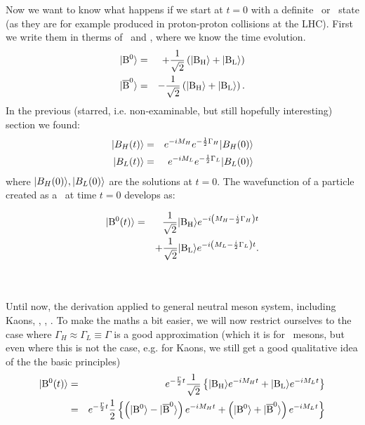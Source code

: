 Now we want to know what happens if we start at $t=0$ with a definite \Bo\ or \Bob\ state (as they are for example produced in proton-proton collisions at the LHC).
First we write them in therms of \Bh\ and \Bl, where we know the time evolution.
\begin{eqnarray}
 | {\rm B^0} \rangle &=&  + \frac{1}{\sqrt{2}} \left( | {\rm B_{H}} \rangle +  | {\rm B_{L}} \rangle\right)\nonumber\\
 | {\rm \overline{B}^0} \rangle&=&  - \frac{1}{\sqrt{2}} \left( | {\rm B_{H}} \rangle +   | {\rm B_{L}} \rangle\right)
.
\end{eqnarray}
%
In the previous (starred, i.e. non-examinable, but still hopefully interesting) section we found:
 \begin{eqnarray}
  | B_H(t) \rangle &=& e^{-iM_H} e^{-\frac{1}{2}\Gamma_H}  | B_H(0) \rangle \nonumber\\
  | B_L(t) \rangle &=& e^{-iM_L} e^{-\frac{1}{2}\Gamma_L}  | B_L(0) \rangle 
 \end{eqnarray}
 where $ | B_H(0) \rangle,  | B_L(0) \rangle$ are the solutions at $t=0$.
%
 The wavefunction of a particle created as a \Bo\ at time $t=0$
 develops as:\\
\newcommand{\expheavy}{e^{-i\left(M_H -\frac{i}{2}\Gamma_H \right) t}}
\newcommand{\explight}{e^{-i\left(M_L -\frac{i}{2}\Gamma_L \right) t}}
\newcommand{\expmh}{e^{-i M_H t}}
\newcommand{\expml}{e^{-i M_L t}}
\newcommand{\expthalf}{e^{-\frac{\Gamma}{2}t}}
%
\parbox{0.97\columnwidth}{
\begin{eqnarray}
%
\ket{\Bo(t)}&=&   \frac{1}{\sqrt{2}}\ket{\Bh}\expheavy \nonumber\\
            & & + \frac{1}{\sqrt{2}}\ket{\Bl}\explight 
.
\nonumber\\
\mbox{}
%
\end{eqnarray}}\\
 Until now, the derivation applied to general neutral meson system,
 including Kaons, \prt{\Do}, , \prt{\Bo}. To make the maths a bit easier, we will now restrict ourselves to the case where $\Gamma_H \approx \Gamma_L \equiv \Gamma$ is a
 good approximation (which it is for \Bo\ mesons, but even where this is not the case, e.g. for Kaons, we still get a good qualitative idea of the the basic principles)\\
\begin{eqnarray}
%
\ket{\Bo(t)} &=&\expthalf \frac{1}{\sqrt{2}} \left\{ \ket{\Bh}\expmh + \ket{\Bl}\expml \right\}
\nonumber \\
 &=& 
\expthalf \frac{1}{2} 
     \left\{ \left( \ket{\Bo}-\ket{\Bob} \right) \expmh
           + \left( \ket{\Bo}+\ket{\Bob} \right) \expml \right\}
\end{eqnarray}
